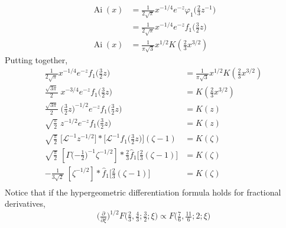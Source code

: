 \documentclass{article}
\theoremstyle{plain}
\newcommand{\laplace}{\mathcal{L}}
\DeclareMathOperator{\Ai}{Ai}
\begin{document}
\begin{align*}
\Ai(x) & = \tfrac{1}{2\sqrt{\pi}} x^{-1/4} e^{-z} \varphi_1\big(\tfrac{2}{3} z^{-1}\big) \\
& = \tfrac{1}{2\sqrt{\pi}} x^{-1/4} e^{-z} f_1\big(\tfrac{3}{2} z\big) \\
\Ai(x) & = \frac{1}{\pi\sqrt{3}} x^{1/2} K(\tfrac{2}{3} x^{3/2})
\end{align*}
Putting together,
\begin{align*}
\tfrac{1}{2\sqrt{\pi}} x^{-1/4} e^{-z} f_1\big(\tfrac{3}{2} z\big) & = \frac{1}{\pi\sqrt{3}} x^{1/2} K(\tfrac{2}{3} x^{3/2}) \\
\tfrac{\sqrt{3\pi}}{2}\;x^{-3/4} e^{-z} f_1\big(\tfrac{3}{2} z\big) & = K(\tfrac{2}{3} x^{3/2}) \\
\tfrac{\sqrt{3\pi}}{2}\;\big(\tfrac{3}{2} z)^{-1/2} e^{-z} f_1\big(\tfrac{3}{2} z\big) & = K(z) \\
\sqrt{\tfrac{\pi}{2}}\;z^{-1/2} e^{-z} f_1\big(\tfrac{3}{2} z\big) & = K(z) \\
\sqrt{\tfrac{\pi}{2}}\;\big[\laplace^{-1} z^{-1/2}\big] * \big[\laplace^{-1} f_1\big(\tfrac{3}{2} z\big)\big](\zeta - 1) & = \hat{K}(\zeta) \\
\sqrt{\tfrac{\pi}{2}}\;\left[\Gamma\big({-\tfrac{1}{2}}\big)^{-1} \zeta^{-1/2}\right] * \tfrac{2}{3} \hat{f}_1\big[\tfrac{2}{3}(\zeta - 1)\big] & = \hat{K}(\zeta) \\
-\tfrac{1}{3\sqrt{2}}\;\left[\zeta^{-1/2}\right] * \hat{f}_1\big[\tfrac{2}{3}(\zeta - 1)\big] & = \hat{K}(\zeta) \\
\end{align*}
Notice that if the hypergeometric differentiation formula holds for fractional derivatives,
\[ \big(\tfrac{\partial}{\partial \xi}\big)^{1/2}F\big(\tfrac{2}{3}, \tfrac{4}{3}; \tfrac{3}{2}; \xi\big) \propto F\big(\tfrac{7}{6}, \tfrac{11}{6}; 2; \xi\big) \]


\end{document}
